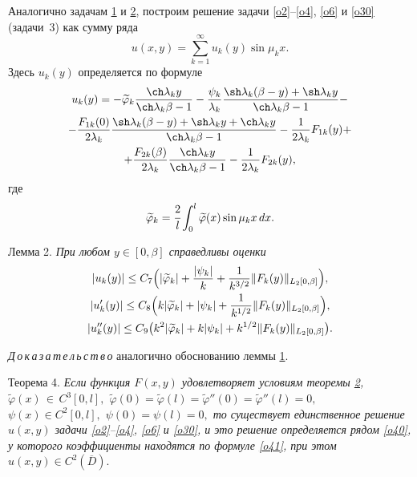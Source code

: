 Аналогично задачам \hyperlink{sab:task1}{1} и \hyperlink{sab:task2}{2}, построим решение задачи \eqref{o2}--\eqref{o4}, \eqref{o6} и \eqref{o30} (задачи\hypertarget{sab:task3}{~}3) как сумму ряда
\begin{equation}
\label{o40}
u(x,y)=\sum\limits_{k=1}^{\infty}u_k(y)\sin\mu_kx.
\end{equation}
Здесь $u_k(y)$ определяется по формуле
\begin{multline}
u_k(y)=-\widetilde{\varphi}_k\frac{\ch\lambda_ky}{\ch\lambda_k\beta-1}- \frac{\psi_k}{\lambda_k}\frac{\sh\lambda_k(\beta-y)+\sh\lambda_ky}{\ch\lambda_k\beta-1}-
\\
\label{o41}
- \frac{F_{1k}(0)}{2\lambda_k}
\frac{\sh\lambda_k(\beta-y)+\sh\lambda_ky+\ch\lambda_ky }{\ch\lambda_k\beta-1}- \frac{1}{2\lambda_k}F_{1k}(y)+
\\ 
+\frac{F_{2k}(\beta)}{2\lambda_k}\frac{\ch\lambda_ky}{\ch\lambda_k\beta-1}- \frac{1}{2\lambda_k}F_{2k}(y),
\end{multline}
где
$$
\widetilde{\varphi}_k=\cfrac{2}{l}\int _{0}^{l}\widetilde{\varphi}(x)\sin\mu_kx\,dx.
$$

\smallskip

\hypertarget{sab:lemma2}{}

{\small \sc Лемма 2.} \textit{При любом $y\in[0,\beta]$ справедливы оценки}
\begin{gather}
|u_k(y)|\leq C_7\Bigl(|\widetilde{\varphi}_k|+\frac{|\psi_k|}{k}+\frac{1}{k^{3/2}}\|F_k(y)\|_{L_2[0,\beta]}\Bigr),
\\
|u'_k(y)|\leq C_8\Bigl(k|\widetilde{\varphi}_k|+|\psi_k|+\frac{1}{k^{1/2}}\|F_k(y)\|_{L_2[0,\beta]}\Bigr),
\\
|u''_k(y)|\leq C_9\bigl(k^2|\widetilde{\varphi}_k|+k|\psi_k|+k^{1/2}\|F_k(y)\|_{L_2[0,\beta]}\bigr).
\end{gather}

\smallskip

\textit{Д\,о\,к\,а\,з\,а\,т\,е\,л\,ь\,с\,т\,в\,о\/} аналогично обоснованию леммы \hyperlink{sab:lemma1}{1}.

\smallskip

\hypertarget{sab:th4}{}

{\small \sc Теорема 4.} \textit{Если функция $F(x,y)$ удовлетворяет условиям теоремы {\em \hyperlink{sab:th2}{2}}, $\widetilde{\varphi}(x)\,{\in}\, C^3[0,l],$
$\widetilde{\varphi}(0)=\widetilde{\varphi}(l)=\widetilde{\varphi}''(0)=\widetilde{\varphi}''(l)=0,$ 
$\psi(x)\in C^2[0,l],$ ${\psi(0)=\psi(l)=0},$ то существует единственное решение $u(x,y)$ задачи {\em \eqref{o2}--\eqref{o4}, \eqref{o6}} и {\em \eqref{o30},} и это решение определяется рядом {\em \eqref{o40},} у которого коэффициенты находятся по формуле {\em \eqref{o41},} при этом $u(x,y)\in C^2(\overline{D}).$}


